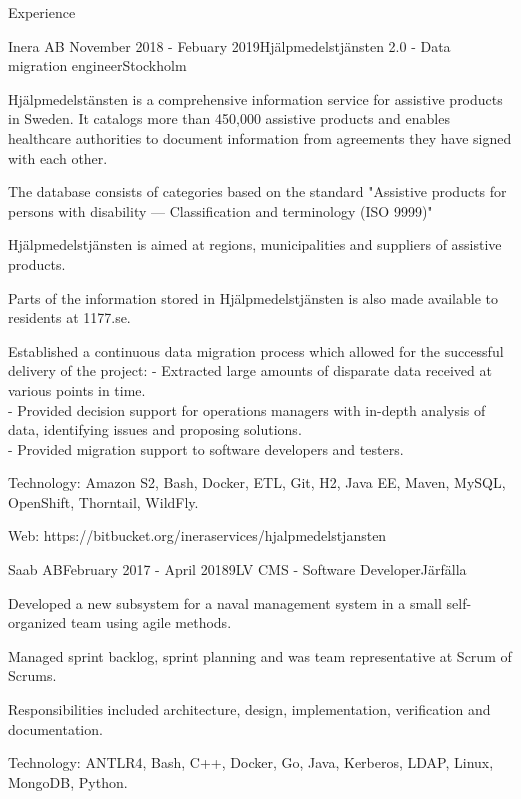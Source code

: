 \documentclass{resume}
\begin{document}
\begin{rSection}{Experience}
    \begin{rSubsection}{Inera AB }{November 2018 - Febuary 2019}{Hjälpmedelstjänsten 2.0 - Data migration engineer}{Stockholm}
      \item Hjälpmedelstänsten is a comprehensive information service for assistive products in Sweden.
      It catalogs more than 450,000 assistive products and enables healthcare authorities to document
      information from agreements they have signed with each other.
      \item The database consists of categories based on the standard "Assistive products for persons with disability — Classification and terminology (ISO 9999)"
      \item Hjälpmedelstjänsten is aimed at regions, municipalities and suppliers of assistive products.
      \item Parts of the information stored in Hjälpmedelstjänsten is also made available to residents at 1177.se.
      \item Established a continuous data migration process which allowed for the successful delivery of the project:
       - Extracted large amounts of disparate data received at various points in time. \\
       - Provided decision support for operations managers with in-depth analysis of data, identifying issues and proposing solutions. \\
       - Provided migration support to software developers and testers.
      \item Technology: Amazon S2, Bash, Docker, ETL, Git, H2, Java EE, Maven, MySQL, OpenShift, Thorntail, WildFly.
      \item Web: https://bitbucket.org/ineraservices/hjalpmedelstjansten
    \end{rSubsection}

    \begin{rSubsection}{Saab AB}{February 2017 - April 2018}{9LV CMS - Software Developer}{Järfälla}
      \item Developed a new subsystem for a naval management system in a small self-organized team using agile methods.
      \item Managed sprint backlog, sprint planning and was team representative at Scrum of Scrums.
      \item Responsibilities included architecture, design, implementation, verification and documentation.
      \item Technology: ANTLR4, Bash, C++, Docker, Go, Java, Kerberos, LDAP, Linux, MongoDB, Python.
    \end{rSubsection}


\end{rSection}
\end{document}
